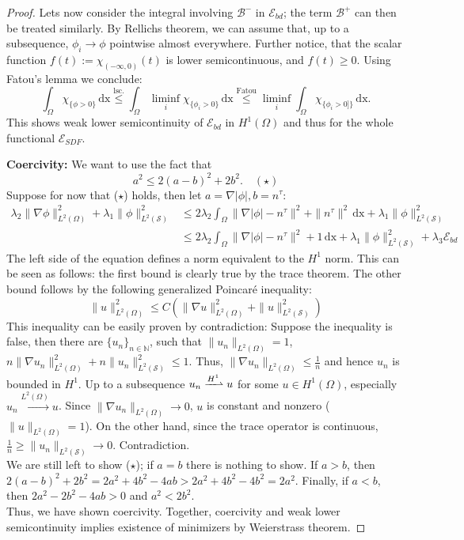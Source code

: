 \documentclass[draft,12pt,openany]{book}
\def\S{\mathcal{S}}
\theoremstyle{plainnormal}
\theoremstyle{remark}
\begin{document}
\begin{proof}
Lets now consider the integral involving $\mathcal{B}^-$ in $\mathcal E_{bd}$; the term $\mathcal B^+$ can then be treated similarly. By Rellichs theorem, we can assume that, up to a subsequence, $\phi_i \rightarrow\phi$ pointwise almost everywhere. Further notice, that the scalar function $f(t) := \chi_{(-\infty, 0)}(t)$ is lower semicontinuous, and $f(t) \geq 0$. Using Fatou's lemma we conclude: $$\int_\Omega  \chi_{\{\phi > 0\}}  \,\mathrm{dx} \overset{\text{lsc.}}{\leq} \int_\Omega \liminf_i  \chi_{\{\phi_i > 0\}}  \,\mathrm{dx} \overset{\text{Fatou}}{\leq} \liminf_i\int_\Omega  \chi_{\{\phi_i > 0]\}}  \,\mathrm{dx}.$$ This shows weak lower semicontinuity of $\mathcal{E}_{bd}$ in $H^1(\Omega)$ and thus for the whole functional $\mathcal{E}_{SDF}.$\par
\textbf{Coercivity:} We want to use the fact that 
$$
    a^2 \leq 2(a-b)^2 + 2b^2. \quad {(\star)}
$$
Suppose for now that ($\star$) holds, then let $a = \nabla |\phi|, b = n^\tau$: 
\begin{align*}
    \lambda_2\|\nabla \phi\| ^2_{L^2(\Omega)} + \lambda_1 \|\phi\| ^2_{L^2(\S)} &\leq 2 \lambda_2\int_\Omega \| \nabla |\phi| - n^\tau\|^2 
 + \|n^\tau\|^2\,\mathrm{dx}+ \lambda_1 \|\phi\| ^2_{L^2(\S)}\\
 &\leq 2 \lambda_2\int_\Omega \| \nabla |\phi| - n^\tau\|^2 
 + 1 \,\mathrm{dx}+ \lambda_1 \|\phi\| ^2_{L^2(\S)} + \lambda_3 \mathcal{E}_{bd}
\end{align*} 
The left side of the equation defines a norm equivalent to the $H^1$ norm. This can be seen as follows: the first bound is clearly true by the trace theorem. The other bound follows by the following generalized Poincar\'e inequality: $$\|u\|^2_{L^2(\Omega)} \leq C( \|\nabla u\|^2_{L^2(\Omega)} +  \|u\|^2_{L^2(\mathcal{\S})})$$
This inequality can be easily proven by contradiction: Suppose the inequality is false, then there are $\{u_n\}_{n\in\mathbb N}$, such that $\|u_n\|_{L^2(\Omega)} = 1$, $n\|\nabla u_n\|^2_{L^2(\Omega)} +  n\|u_n\|^2_{L^2(\mathcal{\S})} \leq 1$. Thus, $\|\nabla u_n\|_{L^2(\Omega)} \leq \frac{1}{n}$ and hence $u_n$ is bounded in $H^1$. Up to a subsequence $u_n \xrightharpoonup{H^1}u$ for some $u\in H^1(\Omega)$, especially $u_n \xrightarrow{L^2(\Omega)}u$. Since $\|\nabla u_n\|_{L^2(\Omega)} \rightarrow 0$, $u$ is constant and nonzero ($\|u\|_{L^2(\Omega)} = 1$). On the other hand, since the trace operator is continuous, $\frac{1}{n} \geq \|u_n\|_{L^2(\S)} \rightarrow 0 $. Contradiction.\\
We are still left to show ($\star$); if $a=b$ there is nothing to show. If $a> b$, then $2(a-b)^2  + 2b^2 = 2a^2 + 4b^2 - 4ab > 2a^2 +4b^2 - 4b^2 = 2a^2 $. Finally, if $a<b$, then $2a^2 - 2b^2 - 4ab > 0$ and $a^2 < 2b^2$.\\
Thus, we have shown coercivity.
Together, coercivity and weak lower semicontinuity implies existence of minimizers by Weierstrass theorem.
\end{proof}
\end{document}

